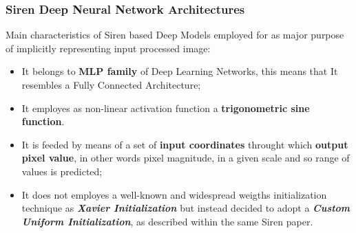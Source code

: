 



\begin{frame}
\frametitle{Siren Deep Neural Network Architectures}
Main characteristics of Siren based Deep Models employed for as major purpose of implicitly representing input processed image:
\begin{itemize}
\item It belongs to \textbf{MLP family} of Deep Learning Networks, this means that It resembles a Fully Connected Architecture;
\item It employes as non-linear activation function a \textbf{trigonometric sine function}.
\item It is feeded by means of a set of \textbf{input coordinates} throught which \textbf{output pixel value}, in other words pixel magnitude, in a given scale and so range of values is predicted;
\item It does not employes a well-known and widespread weigths initialization technique as \textbf{\emph{Xavier Initialization}} but instead decided to adopt a \textbf{\emph{Custom Uniform Initialization}}, as described within the same Siren paper.
\end{itemize}
\end{frame}
